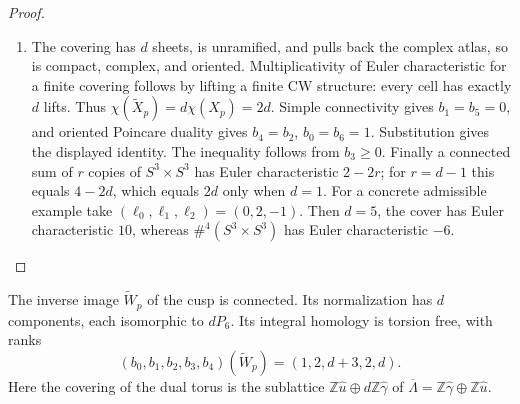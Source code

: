 \begin{proof}
\begin{enumerate}[label=\arabic*.,leftmargin=*]
\item The covering has $d$ sheets, is unramified, and pulls back the complex
atlas, so is compact, complex, and oriented. Multiplicativity of Euler
characteristic for a finite covering follows by lifting a finite CW
structure: every cell has exactly $d$ lifts. Thus
$\chi(\widetilde X_p)=d\chi(X_p)=2d$.
Simple connectivity gives $b_1=b_5=0$, and oriented Poincare duality gives
$b_4=b_2$, $b_0=b_6=1$. Substitution gives the displayed identity. The
inequality follows from $b_3\geq0$. Finally a connected sum of $r$
copies of $S^3\times S^3$ has Euler characteristic $2-2r$; for $r=d-1$
this equals $4-2d$, which equals $2d$ only when $d=1$.
For a concrete admissible example take $(\ell_0,\ell_1,\ell_2)=(0,2,-1)$.
Then $d=5$, the cover has Euler characteristic $10$, whereas
$\#^4(S^3\times S^3)$ has Euler characteristic $-6$.
\end{enumerate}
\end{proof}

\begin{theorem}\label{maps:src:D.1.2}


The inverse image $\widetilde W_p$ of the cusp is connected. Its
normalization has $d$ components, each isomorphic to $dP_6$. Its
integral homology is torsion free, with ranks
\[
 (b_0,b_1,b_2,b_3,b_4)(\widetilde W_p)=(1,2,d+3,2,d).
\]
Here the covering of the dual torus is the sublattice
$\mathbb Z\widehat u\oplus d\mathbb Z\widehat\gamma$ of
$\overline\Lambda=\mathbb Z\widehat\gamma\oplus\mathbb Z\widehat u$.
\end{theorem}


